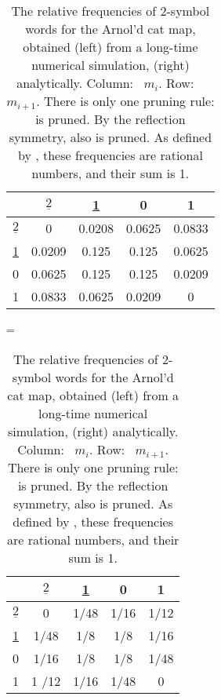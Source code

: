 \begin{table}
\begin{center}
\begin{tabular}{ c|cccc }
 & $\underline{2}$ & \underline{1} & 0 & 1\\
  \hline
 $\underline{2}$ &  0  & 0.0208 &  0.0625 &  0.0833\\
 \underline{1} &  0.0209 &  0.125 &  0.125 &  0.0625 \\
 0 & 0.0625 & 0.125 & 0.125 &  0.0209\\
 1 & 0.0833 & 0.0625 &  0.0209 &  0\\
\end{tabular}
=
\begin{tabular}{ c|cccc }
 & $\underline{2}$ & \underline{1} & 0 & 1\\
  \hline
 $\underline{2}$ &  0    & 1/48 &  1/16 &  1/12\\
 \underline{1} &  1/48 &  1/8 &  1/8 &  1/16 \\
  0 &  1/16 & 1/8  &  1/8 &  1/48\\
  1 & 1 /12 & 1/16 &  1/48 &  0\\
\end{tabular}
\end{center}
  \caption{\label{tab:RJ2letFreq}
The relative frequencies of 2-symbol words  for
the Arnol'd cat map, obtained (left) from a long-time numerical simulation,
(right) analytically.
Column: \ $m_{i}$.  Row: \ $m_{i+1}$.
There is only one pruning rule:  is pruned. By the reflection
symmetry, also  is pruned. As defined by
, these frequencies are rational numbers, and
their sum is 1.
  }
\end{table}



